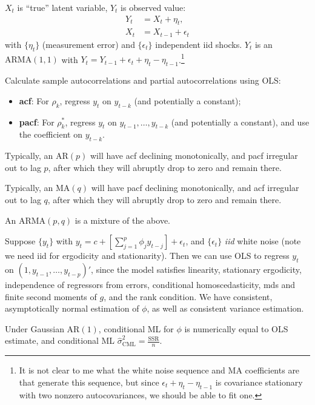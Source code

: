 \documentclass[8pt,letterpaper, landscape]{extarticle} %
\begin{document}
\begin{multicols}{3}
\begin{description}
 $ X_t $ is ``true'' latent variable, $ Y_t $ is observed value:
\begin{align*}
Y_t &= X_t + \eta_t , \\
X_t &= X_{t-1} + \epsilon_t
\end{align*}
with $ \{ \eta_t \} $ (measurement error) and $ \{ \epsilon_t \} $ independent iid shocks. $ Y_t $ is an $ \text{ARMA} (1,1) $ with $ Y_t = Y_{t-1} + \epsilon_t + \eta_t - \eta_{t-1} $.\footnote{It is not  clear to me what the white noise sequence and MA coefficients are that generate this sequence, but since $ \epsilon_t + \eta_t - \eta_{t-1}  $  is covariance stationary with two nonzero autocovariances, we should be able to fit one.}

 Calculate sample autocorrelations and partial autocorrelations using OLS:
\begin{itemize}
\item \textbf{acf}: For $ \rho_k $, regress $ y_t $ on $ y_{t-k} $ (and potentially a constant);
\item \textbf{pacf}: For $ \rho^*_k $, regress $ y_t $ on $ y_{t-1}, \dotsc , y_{t-k} $ (and potentially a constant), and use the coefficient on $ y_{t-k} $.
\end{itemize}

Typically, an $ \text{AR} (p) $ will have acf declining monotonically, and pacf irregular out to lag $ p $, after which they will abruptly drop to zero and remain there.

Typically, an $ \text{MA} (q) $ will have pacf declining monotonically, and acf irregular out to lag $ q $, after which they will abruptly drop to zero and remain there.

An $ \text{ARMA} (p,q) $ is a mixture of the above.

 Suppose $ \{ y_t \} $ with $ y_t = c + [ \sum_{j=1}^{p} \phi_j y_{t-j} ] + \epsilon_{t} $, and $ \{ \epsilon_t \} $ \textit{iid} white noise (note we need iid for ergodicity and stationarity). Then we can use OLS to regress $ y_t $ on $ (1, y_{t-1}, \dotsc , y_{t-p})' $, since the model satisfies linearity, stationary ergodicity, independence of regressors from errors, conditional homoscedasticity, mds and finite second moments of $ g $, and the rank condition. We have consistent, asymptotically normal estimation of $ \phi $, as well as consistent variance estimation.

Under Gaussian $ \text{AR} (1) $, conditional ML for $ \phi $ is numerically equal to OLS estimate, and conditional ML $ \hat{\sigma}^{2}_{\text{CML}} = \frac{\text{SSR}}{n} $.


\end{description}
\end{multicols}
\end{document}
